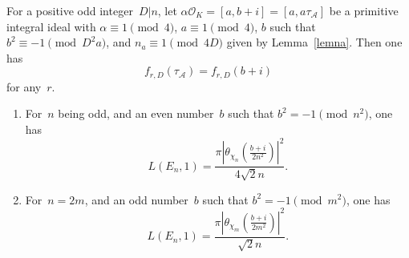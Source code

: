 \documentclass[10pt,a4paper]{amsart}
\begin{document}
\begin{lemma}\label{shimuraff}
For a positive odd integer~$D|n$, let $\alpha\mathcal{O}_{K}=[a,b+i]=[a,a\tau_{\mathcal{A}}]$ be a primitive integral ideal with $\alpha\equiv1\pmod{4}$,  $a\equiv1\pmod{4}$, $b$  such that $b^{2}\equiv-1\pmod{D^{2}a}$, and $n_{a}\equiv1\pmod{4D}$ given by Lemma~\ref{lemna}. Then one has
$$
f_{r,D}(\tau_{\mathcal{A}})=f_{r,D}(b+i)
$$
for any~$r$.
\end{lemma}

\begin{theorem}\label{main4}
\begin{enumerate}
    \item For~$n$ being odd, and an even number~$b$ such that $b^{2}=-1\pmod{n^{2}}$, one has
    \[
L(E_n,1)=\frac{\pi \left|\theta_{\chi_{n}}\left(\frac{b+i}{2
n^2}\right)\right|^2}{4\sqrt{2}n }.
\]

\item For~$n=2m$, and an odd number~$b$ such that $b^{2}=-1\pmod{m^{2}}$, one has
    \[
L(E_n,1)=\frac{\pi \left|\theta_{\chi_{m}}\left(\frac{b+i}{2
m^2}\right)\right|^2}{\sqrt{2}n }.
\]
\end{enumerate}

\end{theorem}
\end{document}
